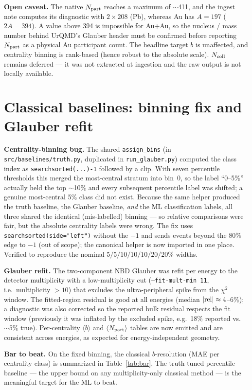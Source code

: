 \documentclass[11pt]{article}
\newcommand{\code}[1]{\texttt{#1}}
\begin{document}
\textbf{Open caveat.} The native $N_{\rm part}$ reaches a maximum of $\sim$411,
and the ingest note computes its diagnostic with $2\times208$ (Pb), whereas Au has
$A=197$ ($2A=394$). A value above 394 is impossible for Au+Au, so the nucleus /
mass number behind UrQMD's Glauber header must be confirmed before reporting
$N_{\rm part}$ as a physical Au participant count. The headline target $b$ is
unaffected, and centrality binning is rank-based (hence robust to the absolute
scale). $N_{\rm coll}$ remains deferred --- it was not extracted at ingestion and
the raw output is not locally available.

\section{Classical baselines: binning fix and Glauber refit}
\textbf{Centrality-binning bug.} The shared \code{assign\_bins} (in
\code{src/baselines/truth.py}, duplicated in \code{run\_glauber.py}) computed the
class index as \code{searchsorted(...)-1} followed by a clip. With seven
percentile thresholds this merged the most-central stratum into bin~0, so the
label ``0--5\%'' actually held the top $\sim$10\% and every subsequent percentile
label was shifted; a genuine most-central 5\% class did not exist. Because the
same helper produced the truth baseline, the Glauber baseline, \emph{and} the ML
classification labels, all three shared the identical (mis-labelled) binning ---
so relative comparisons were fair, but the absolute centrality labels were wrong.
The fix uses \code{searchsorted(side="left")} without the $-1$ and sends events
beyond the 80\% edge to $-1$ (out of scope); the canonical helper is now imported
in one place. Verified to reproduce the nominal $5/5/10/10/10/20/20\%$ widths.

\textbf{Glauber refit.} The two-component NBD Glauber was refit per energy to the
detector multiplicity with a low-multiplicity cut (\code{--fit-mult-min 11},
i.e.\ multiplicity $>10$) that excludes the ultra-peripheral spike from the
$\chi^2$ window. The fitted-region residual is good at all energies (median
$|{\rm rel}|\approx4$--$6\%$); a diagnostic was also corrected so the reported
bulk residual respects the fit window (previously it was inflated by the excluded
spike, e.g.\ 18\% reported vs.\ $\sim$5\% true). Per-centrality $\langle
b\rangle$ and $\langle N_{\rm part}\rangle$ tables are now emitted and are
consistent across energies, as expected for energy-independent geometry.

\textbf{Bar to beat.} On the fixed binning, the classical $b$-resolution
(MAE per centrality class) is summarized in Table~\ref{tab:bar}. The truth-tuned
percentile baseline --- the upper bound on any multiplicity-only classical method
--- is the meaningful target for the ML to beat.
\end{document}
